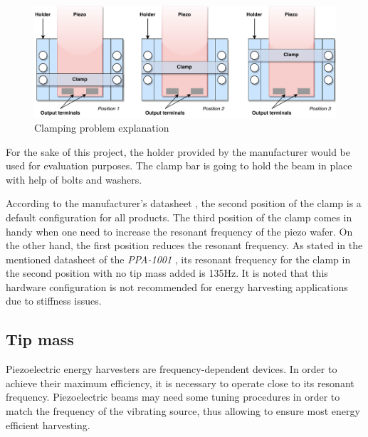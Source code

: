 \documentclass[12pt,a4paper]{article}
\begin{document}
\begin{figure}[ht!]
\includegraphics[scale=0.85]{clamping.pdf}
\caption{Clamping problem explanation}
\label{fig:clamping}
\end{figure}

For the sake of this project, the holder provided by the manufacturer would be used for evaluation purposes. The clamp bar is going to hold the beam in place with help of bolts and washers.\par
According to the manufacturer's datasheet \cite{PPA}, the second position of the clamp is a default configuration for all products. The third position of the clamp comes in handy when one need to increase the resonant frequency of the piezo wafer. On the other hand, the first position reduces the resonant frequency. As stated in the mentioned datasheet of the \textit{PPA-1001} \cite{PPA}, its resonant frequency for the clamp in the second position with no tip mass added is 135Hz. It is noted that this hardware configuration is not recommended for energy harvesting applications due to stiffness issues.\par

\subsection{Tip mass}
Piezoelectric energy harvesters are frequency-dependent devices. In order to achieve their maximum efficiency, it is necessary to operate close to its resonant frequency. Piezoelectric beams may need some tuning procedures in order to match the frequency of the vibrating source, thus allowing to ensure most energy efficient harvesting.\par
\end{document}
